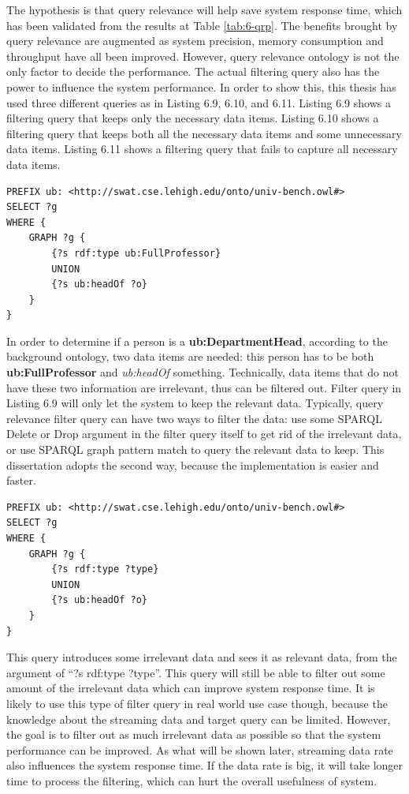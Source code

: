 The hypothesis is that query relevance will help save system response time, which has been validated from the results at Table \ref{tab:6-qrp}. 
The benefits brought by query relevance are augmented as system precision, memory consumption and throughput have all been improved. 
However, query relevance ontology is not the only factor to decide the performance. 
The actual filtering query also has the power to influence the system performance. 
In order to show this, this thesis has used three different queries as in Listing 6.9, 6.10, and 6.11.
Listing 6.9 shows a filtering query that keeps only the necessary data items.
Listing 6.10 shows a filtering query that keeps both all the necessary data items and some unnecessary data items.
Listing 6.11 shows a filtering query that fails to capture all necessary data items.

\begin{lstlisting}[caption={\textbf{Query Relevance Filtering Query 1}},basicstyle=\small]
PREFIX ub: <http://swat.cse.lehigh.edu/onto/univ-bench.owl#>
SELECT ?g
WHERE {
    GRAPH ?g {
        {?s rdf:type ub:FullProfessor}
        UNION
    	{?s ub:headOf ?o}  
    }
}
\end{lstlisting}

In order to determine if a person is a \textbf{ub:DepartmentHead}, according to the background ontology, two data items are needed: this person has to be both \textbf{ub:FullProfessor} and \textit{ub:headOf} something.
Technically, data items that do not have these two information are irrelevant, thus can be filtered out. 
Filter query in Listing 6.9 will only let the system to keep the relevant data.
Typically, query relevance filter query can have two ways to filter the data: use some SPARQL Delete or Drop argument in the filter query itself to get rid of the irrelevant data, or use SPARQL graph pattern match to query the relevant data to keep. 
This dissertation adopts the second way, because the implementation is easier and faster.

\begin{lstlisting}[caption={\textbf{Query Relevance Filtering Query 2}},basicstyle=\small]
PREFIX ub: <http://swat.cse.lehigh.edu/onto/univ-bench.owl#>
SELECT ?g
WHERE { 
    GRAPH ?g {
        {?s rdf:type ?type}
        UNION 
        {?s ub:headOf ?o}  
    }
}
\end{lstlisting}

This query introduces some irrelevant data and sees it as relevant data, from the argument of ``?s rdf:type ?type''.
This query will still be able to filter out some amount of the irrelevant data which can improve system response time.
It is likely to use this type of filter query in real world use case though, because the knowledge about the streaming data and target query can be limited. 
However, the goal is to filter out as much irrelevant data as possible so that the system performance can be improved.
As what will be shown later, streaming data rate also influences the system response time. 
If the data rate is big, it will take longer time to process the filtering, which can hurt the overall usefulness of system.

